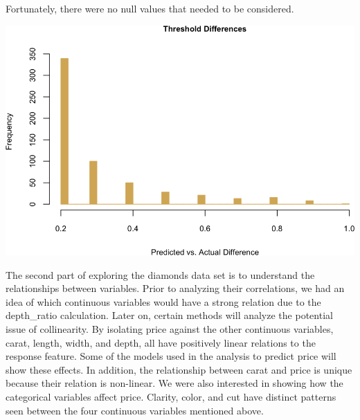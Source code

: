 \documentclass[
  paper=a4,
  ,captions=tableheading
]{scrartcl}
\begin{document}
Fortunately, there were no null values that needed to be considered.

\begin{center}\includegraphics{Diamonds_PDF_files/figure-latex/threshold diff hist-1} \end{center}

The second part of exploring the diamonds data set is to understand the
relationships between variables. Prior to analyzing their correlations,
we had an idea of which continuous variables would have a strong
relation due to the depth\_ratio calculation. Later on, certain methods
will analyze the potential issue of collinearity. By isolating price
against the other continuous variables, carat, length, width, and depth,
all have positively linear relations to the response feature. Some of
the models used in the analysis to predict price will show these
effects. In addition, the relationship between carat and price is unique
because their relation is non-linear. We were also interested in showing
how the categorical variables affect price. Clarity, color, and cut have
distinct patterns seen between the four continuous variables mentioned
above.
\end{document}
